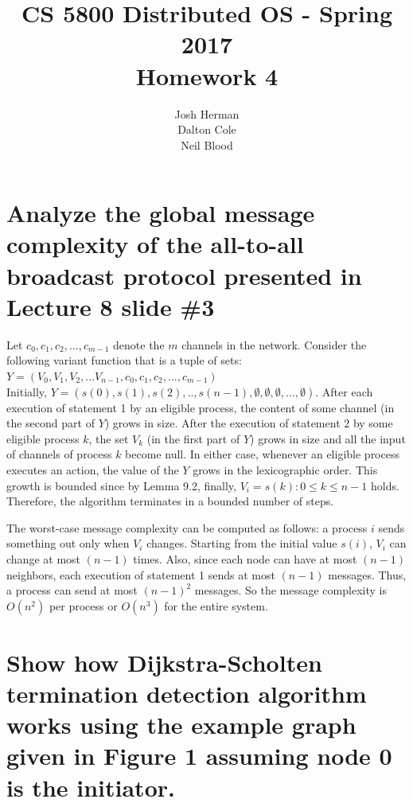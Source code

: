 \documentclass[times]{article}
\begin{document}
	\title{CS 5800 Distributed OS - Spring 2017 \\ Homework 4}
	\author{Josh Herman \\ Dalton Cole \\ Neil Blood}
	\date{}
	\maketitle

	\section{Analyze the global message complexity of the all-to-all broadcast protocol presented in Lecture 8 slide \#3}
		Let $c_0,c_1,c_2,...,c_{m-1}$ denote the $m$ channels in the network. Consider the following variant function that is a tuple of sets: 
		\\$Y=(V_0,V_1,V_2,...V_{n-1},c_0,c_1,c_2,...,c_{m-1})$
		\\Initially, $Y=(s(0),s(1),s(2),..,s(n-1),\emptyset,\emptyset,\emptyset,...,\emptyset)$. After each execution of statement 1 by an eligible process, the content of some channel (in the second part of $Y$) grows in size. After the execution of statement 2 by some eligible process $k$, the set $V_k$ (in the first part of $Y$) grows in size and all the input of channels of process $k$ become null. In either case, whenever an eligible process executes an action, the value of the $Y$ grows in the lexicographic order. This growth is bounded since by Lemma 9.2, finally, $V_i = {s(k): 0 ≤ k ≤ n − 1}$ holds. Therefore, the algorithm terminates in a bounded number of steps.
		
		The worst-case message complexity can be computed as follows: a process $i$ sends something out only when $V_i$ changes. Starting from the initial value $s(i)$, $V_i$ can change at most $(n−1)$ times. Also, since each node can have at most $(n−1)$ neighbors, each execution of statement 1 sends at most $(n−1)$ messages. Thus, a process can send at most $(n−1)^2$ messages. So the message complexity is $O(n^2)$ per process or $O(n^3)$ for the entire system.
	
	\section{Show how Dijkstra-Scholten termination detection algorithm works using the example graph given in Figure 1 assuming node 0 is the initiator.}
		
\end{document}
